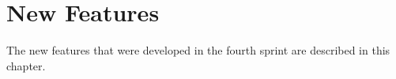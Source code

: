 
\chapter{New Features}
\label{cha:new_features}

The new features that were developed in the fourth sprint are described in this chapter.





